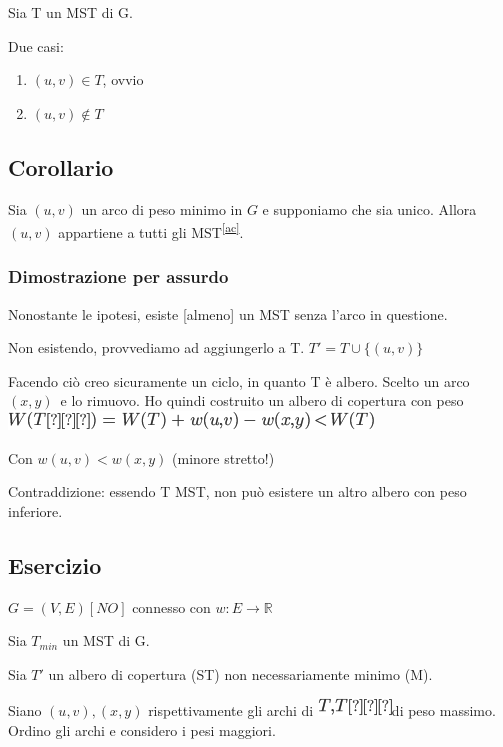 \documentclass{article}
\providecommand{\tightlist}{%
  \setlength{\itemsep}{0pt}\setlength{\parskip}{0pt}}
\begin{document}
{{{{Sia T un MST di G. }

{Due casi:}

\begin{enumerate}
\tightlist
\item
  $(u,v)\in T${, ovvio}
\item
  $(u,v)\notin T$
\end{enumerate}

\subsection{Corollario}

{Sia $(u,v)$ un arco di peso minimo in $G$ e supponiamo che sia unico. Allora $(u,v)$ appartiene a tutti gli MST}\textsuperscript{\protect\hyperlink{cmnt29}{{[}ac{]}}}{.}

\subsubsection{Dimostrazione per assurdo}

{Nonostante le ipotesi, esiste {[}almeno{]} un MST senza l'arco in
questione.}

{Non esistendo, provvediamo ad aggiungerlo a T. $T' = T \cup \{(u,v)\}$}

{Facendo ciò creo sicuramente un ciclo, in quanto T è albero. Scelto un
arco }$(x,y)${~e lo rimuovo. Ho quindi
costruito un albero di copertura con peso
}\includegraphics{images/image470.png}

{Con $w(u,v) < w(x,y)$ (minore stretto!)}

{Contraddizione}{: essendo T MST, non può esistere un altro albero con
peso inferiore.}

\subsection{Esercizio}

$G=(V,E) [NO]$ connesso con $w:E \rightarrow \mathbb{R}$

{Sia $T_{min}$ un MST di G.}

{Sia $T'$ un albero di copertura (ST) non necessariamente minimo (M).}

{Siano $(u,v),(x,y)$ rispettivamente gli archi
di }\includegraphics{images/image475.png}{di peso massimo. Ordino gli
archi e considero i pesi maggiori.}

}}}
\end{document}
